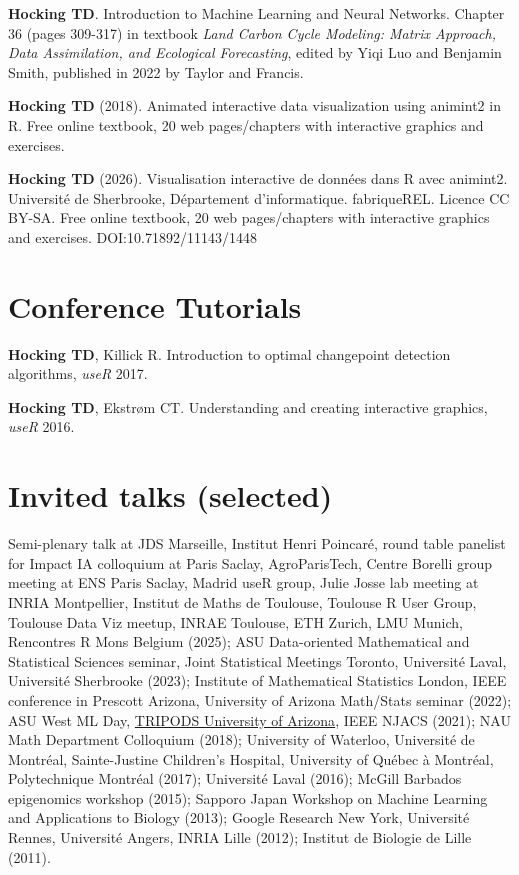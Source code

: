\documentclass[margin,line]{res}
\begin{document}
\begin{resume}
{\bf Hocking TD}. Introduction to Machine Learning and Neural
Networks. Chapter 36 (pages 309-317) in textbook {\it Land Carbon Cycle Modeling: Matrix
  Approach, Data Assimilation, and Ecological Forecasting}, edited by
Yiqi Luo and Benjamin Smith, published in 2022 by Taylor and Francis.

{\bf Hocking TD} (2018). Animated interactive data visualization using
animint2 in R. Free online textbook, 20 web pages/chapters with interactive graphics and exercises.

{\bf Hocking TD} (2026). Visualisation interactive de données dans R avec animint2. Université de Sherbrooke, Département d’informatique. fabriqueREL. Licence CC BY-SA. Free online textbook, 20 web pages/chapters with interactive graphics and exercises. DOI:10.71892/11143/1448 

\section{\sc Conference Tutorials}

{\bf Hocking TD}, Killick R. Introduction to optimal changepoint
detection algorithms, {\it useR} 2017.

{\bf Hocking TD}, Ekstr\o m CT. Understanding and creating interactive
graphics, {\it useR} 2016.

\section{\sc Invited talks (selected)}

Semi-plenary talk at JDS Marseille, Institut Henri Poincaré, round table panelist for Impact IA colloquium at Paris Saclay, AgroParisTech, Centre Borelli group meeting at ENS Paris Saclay, Madrid useR group, Julie Josse lab meeting at INRIA Montpellier, Institut de Maths de Toulouse, Toulouse R User Group, Toulouse Data Viz meetup, INRAE Toulouse, ETH Zurich, LMU Munich, Rencontres R Mons Belgium (2025); ASU Data-oriented Mathematical and Statistical Sciences seminar, Joint
Statistical Meetings Toronto, Universit\'e Laval, Universit\'e
Sherbrooke (2023); Institute of Mathematical Statistics London, IEEE
conference in Prescott Arizona, University of Arizona Math/Stats
seminar (2022); ASU West ML Day,
\href{https://arizona.hosted.panopto.com/Panopto/Pages/Viewer.aspx?id=4e87c8d0-96d2-40d1-808c-ad16014c6962}{TRIPODS
  University of Arizona}, IEEE NJACS (2021); NAU Math Department
Colloquium (2018); University of Waterloo, Université de Montréal,
Sainte-Justine Children's Hospital, University of Québec à Montréal,
Polytechnique Montréal (2017); Universit\'e Laval (2016); McGill
Barbados epigenomics workshop (2015); Sapporo Japan Workshop on
Machine Learning and Applications to Biology (2013); Google Research
New York, Universit\'e Rennes, Universit\'e Angers, INRIA Lille
(2012); Institut de Biologie de Lille (2011).


\end{resume}
\end{document}
